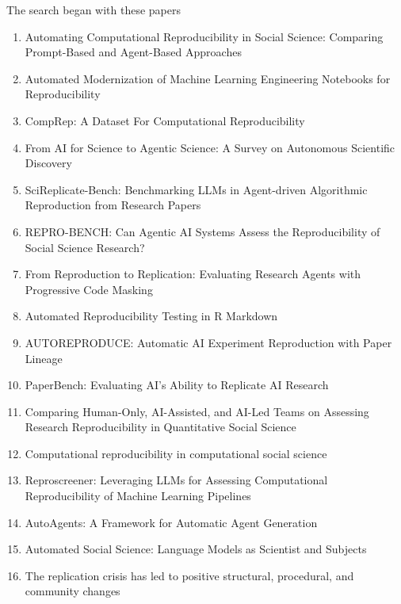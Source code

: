 \documentclass[8pt,a4paper]{article}
\begin{document}
The search began with these papers
\begin{enumerate}
    \item Automating Computational Reproducibility in Social Science: Comparing Prompt-Based and Agent-Based Approaches\cite{shah2026}
    \item Automated Modernization of Machine Learning Engineering  Notebooks for Reproducibility\cite{jin2026}
    \item CompRep: A Dataset For Computational Reproducibility\cite{comprep}
    \item From AI for Science to Agentic Science:  A Survey on Autonomous Scientific Discovery\cite{wei2025}
    \item SciReplicate-Bench: Benchmarking LLMs in Agent-driven Algorithmic Reproduction from Research Papers\cite{scireplicatebench}
    \item REPRO-BENCH: Can Agentic AI Systems Assess the Reproducibility of  Social Science Research?\cite{reprobench}
    \item From Reproduction to Replication: Evaluating Research Agents with Progressive Code Masking\cite{autoexperiment}
    \item Automated Reproducibility Testing in R Markdown\cite{brandmaier2025}
    \item AUTOREPRODUCE: Automatic AI Experiment  Reproduction with Paper Lineage\cite{autoreproduce}
    \item PaperBench: Evaluating AI’s Ability to Replicate AI Research\cite{paperbench}
    \item Comparing Human-Only, AI-Assisted, and AI-Led Teams on Assessing Research Reproducibility in Quantitative Social Science\cite{bensch2025}
    \item Computational reproducibility in computational social science\cite{schoch2023}
    \item Reproscreener: Leveraging LLMs for Assessing Computational Reproducibility of Machine Learning Pipelines\cite{reproscreener}
    \item AutoAgents: A Framework for Automatic Agent  Generation\cite{chen2024}
    \item Automated Social Science: Language Models as Scientist and Subjects\cite{manning2024}
    \item The replication crisis has led to positive structural, procedural, and community changes\cite{korbmacher2023}
\end{enumerate}
\end{document}
